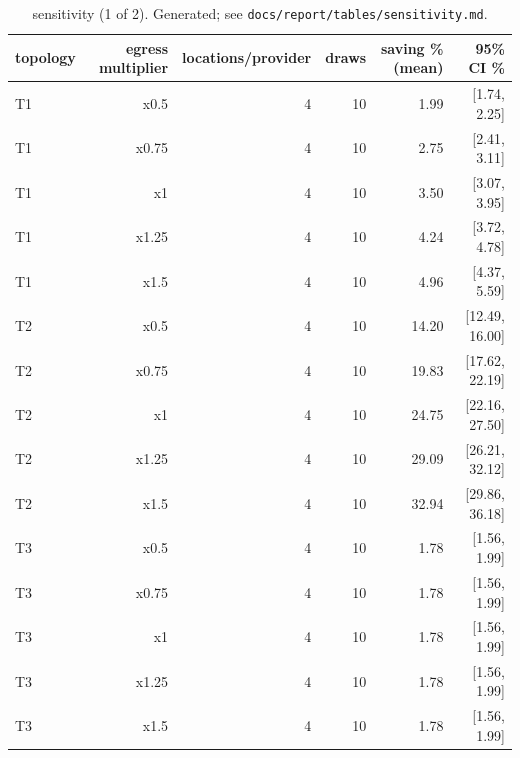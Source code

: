 \begin{table}[t]
\centering
\small
\begin{tabular}{lrrrrr}
\toprule
topology & egress multiplier & locations/provider & draws & saving \% (mean) & 95\% CI \% \\
\midrule
T1 & x0.5 & 4 & 10 & 1.99 & [1.74, 2.25] \\
T1 & x0.75 & 4 & 10 & 2.75 & [2.41, 3.11] \\
T1 & x1 & 4 & 10 & 3.50 & [3.07, 3.95] \\
T1 & x1.25 & 4 & 10 & 4.24 & [3.72, 4.78] \\
T1 & x1.5 & 4 & 10 & 4.96 & [4.37, 5.59] \\
T2 & x0.5 & 4 & 10 & 14.20 & [12.49, 16.00] \\
T2 & x0.75 & 4 & 10 & 19.83 & [17.62, 22.19] \\
T2 & x1 & 4 & 10 & 24.75 & [22.16, 27.50] \\
T2 & x1.25 & 4 & 10 & 29.09 & [26.21, 32.12] \\
T2 & x1.5 & 4 & 10 & 32.94 & [29.86, 36.18] \\
T3 & x0.5 & 4 & 10 & 1.78 & [1.56, 1.99] \\
T3 & x0.75 & 4 & 10 & 1.78 & [1.56, 1.99] \\
T3 & x1 & 4 & 10 & 1.78 & [1.56, 1.99] \\
T3 & x1.25 & 4 & 10 & 1.78 & [1.56, 1.99] \\
T3 & x1.5 & 4 & 10 & 1.78 & [1.56, 1.99] \\
\bottomrule
\end{tabular}
\caption{sensitivity (1 of 2). Generated; see \texttt{docs/report/tables/sensitivity.md}.}
\label{tab:sensitivity-1}
\end{table}

